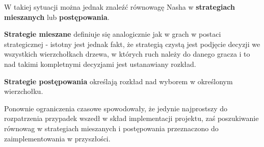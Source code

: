 \documentclass[polish]{standalone}
\begin{document}
W takiej sytuacji można jednak znaleźć równowagę Nasha w \textbf{strategiach mieszanych} lub \textbf{postępowania}.

\begin{definition}
\textbf{Strategie mieszane} definiuje się analogicznie jak w grach w postaci strategicznej - istotny jest jednak fakt,
że strategią czystą jest podjęcie decyzji we wszystkich wierzchołkach drzewa, w których ruch należy do danego gracza
i to nad takimi kompletnymi decyzjami jest ustanawiany rozkład.
\end{definition}

\begin{definition}
\textbf{Strategie postępowania} określają rozkład nad wyborem w określonym wierzchołku.
\cite[str.~83]{FT-GT}
\end{definition}

Ponownie ograniczenia czasowe spowodowały, że jedynie najprostszy do rozpatrzenia przypadek wszedł w skład implementacji
projektu, zaś poszukiwanie równowag w strategiach mieszanych i postępowania przeznaczono do zaimplementowania
w przyszłości.
\end{document}
